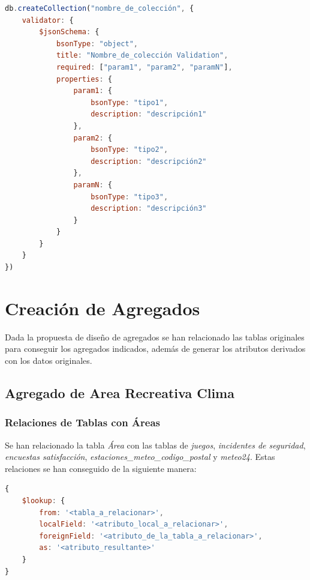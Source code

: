 \documentclass[]{article}
\begin{document}
\begin{lstlisting}[language=JavaScript, caption=Estructura genérica de la validación de esquemas]
db.createCollection("nombre_de_colección", {
    validator: {
        $jsonSchema: {
            bsonType: "object",
            title: "Nombre_de_colección Validation",
            required: ["param1", "param2", "paramN"],
            properties: {
                param1: {
                    bsonType: "tipo1",
                    description: "descripción1"
                },
                param2: {
                    bsonType: "tipo2",
                    description: "descripción2"
                },
                paramN: {
                    bsonType: "tipo3",
                    description: "descripción3"
                }
            }
        }
    }
})
\end{lstlisting}

\newpage
\section{Creación de Agregados}
\label{sec:creacion_agregados}
Dada la propuesta de diseño de agregados se han relacionado las tablas originales para conseguir los agregados indicados, además de generar los atributos derivados con los datos originales.

\subsection{Agregado de Area Recreativa Clima}
\label{subsec:agregado_area}

\subsubsection{Relaciones de Tablas con Áreas}
\label{subsubsec:relaciones_area}

Se han relacionado la tabla \textit{Área} con las tablas de \textit{juegos}, \textit{incidentes de seguridad}, \textit{encuestas satisfacción}, \textit{estaciones\_meteo\_codigo\_postal} y \textit{meteo24}.
Estas relaciones se han conseguido de la siguiente manera:
\begin{lstlisting}[language=JavaScript, caption=Operadores para relacionar tablas en mongodb]
{
    $lookup: {
        from: '<tabla_a_relacionar>',
        localField: '<atributo_local_a_relacionar>',
        foreignField: '<atributo_de_la_tabla_a_relacionar>',
        as: '<atributo_resultante>'
    }
}
\end{lstlisting}
\end{document}
